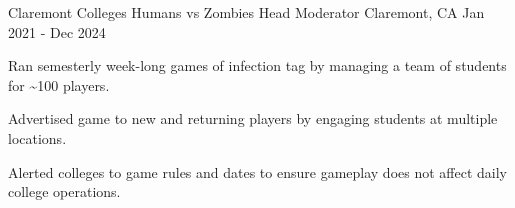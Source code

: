   \begin{cventry}
    {Claremont Colleges Humans vs Zombies} %
    {Head Moderator} %
    {Claremont, CA} %
    {Jan 2021 - Dec 2024} %
    {
      \begin{cvitems} %
        \item {
            Ran semesterly week-long games of infection tag by managing a team of students for \~{}100 players.
        }
        \item {
        Advertised game to new and returning players by engaging students at multiple locations.
        }
        \item {
        Alerted colleges to game rules and dates to ensure gameplay does not affect daily college operations.
        }
      \end{cvitems}
    }
  \end{cventry}
